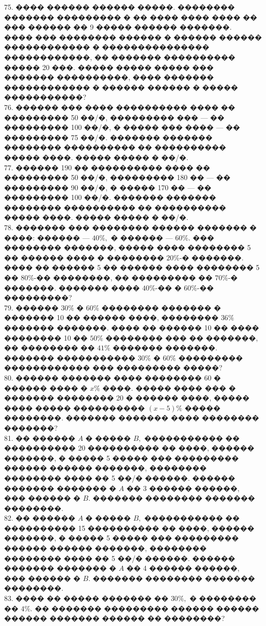 \documentclass[12pt]{article}
\begin{document}
75. ���� ������ ������ �����. �������� ������� ��������� � �� ���� ���� ���� �� ��� ������ �� 9 ����� ������ �������. ���� ��� �������� ������ � ������ ������ ������������ � ��������������� ������������, �� ������� ���������� ����� 20 ���. ����� ����� ����� ��� ������� ����������, ���� ������� ������������ � ������ ������ � ����� �����������?\\
76. ������ ��� ���� ���������� ���� �� ��������� 50 ��/�, ��������� ��� --- �� ��������� 100 ��/�, � ����� ��� ���� --- �� ��������� 75 ��/�. ������� ������� �������� ���������� �� ���������� ����� ����. ����� ����� � ��/�.\\
77. ������ 190 �� ���������� ���� �� ��������� 50 ��/�, ��������� 180 �� --- �� ��������� 90 ��/�, � ����� 170 �� --- �� ��������� 100 ��/�. ������� ������� �������� ���������� �� ���������� ����� ����. ����� ����� � ��/�.\\
78. ������� ��� �������� ������ ������� � ����: ������ --- $40\%,$ � ������ --- $60\%.$ ��� �������� �������, ����� ���� �������� 5 �� ������ ���� � �������� $20\%$-� �������. ���� �� ������ 5 �� ������ ���� �������� 5 �� $80\%$-�� ��������, �� ��������� �� $70\%$-� �������. ������� ���� $40\%$-�� � $60\%$-�� ���������?\\
79. ������ $30\%$ � $60\%$ �������� ������� � ������� 10 �� ������ ����, �������� $36\%$ ������� �������. ���� �� ������ 10 �� ���� �������� 10 �� $50\%$ �������� ��� �� �������, �� �������� �� $41\%$ ������� �������. ������� ����������� $30\%$ � $60\%$ ��������� ������������ ��� ��������� �����?\\
80. ������ ������� ���� �������� 60 � ������ ���� � $x\%$ ����. ����� ���� ��� � ������� �������� 20 � ������ ����, ����� ���� ����� ���������� $(x-5)\%$ ����� ��������. ������� ������� ���� �������� �������?\\
81. �� ������ $A$ � ����� $B,$ ����������� �� ���������� 20 ���������� �� ����, ������ �������,
� ����� 5 ����� ��� ��������� ������ ������ �������, �������� �������� ���� �� 5 ��/� ������. ������ ������� ������� � $A$
�� 3 ������ ������, ��� ������ � $B.$ ������� �������� ������� ��������.\\
82. �� ������ $A$ � ����� $B,$ ����������� �� ���������� 15 ���������� �� ����, ������ �������,
� ����� 5 ����� ��� ��������� ������ ������ �������, �������� �������� ���� �� 5 ��/� ������. ������ ������� ������� � $A$
�� 4 ������ ������, ��� ������ � $B.$ ������� �������� ������� ��������.\\
83. ���� �� ����� ������� �� $30\%,$ � �������� �� $4\%.$ �� ������� ��������� ������ ������ ������ ������� ������ �� ��������?\\
\end{document}
